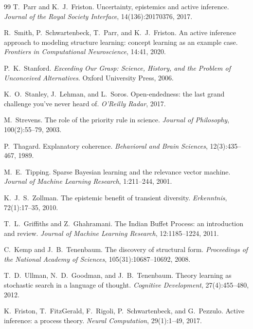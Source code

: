 \documentclass[runningheads]{llncs}
\begin{document}
\begin{thebibliography}{99}
T.~Parr and K.~J.~Friston.
Uncertainty, epistemics and active inference.
\emph{Journal of the Royal Society Interface}, 14(136):20170376, 2017.

R.~Smith, P.~Schwartenbeck, T.~Parr, and K.~J.~Friston.
An active inference approach to modeling structure learning: concept learning as an example case.
\emph{Frontiers in Computational Neuroscience}, 14:41, 2020.

P.~K.~Stanford.
\emph{Exceeding Our Grasp: Science, History, and the Problem of Unconceived Alternatives}.
Oxford University Press, 2006.

K.~O.~Stanley, J.~Lehman, and L.~Soros.
Open-endedness: the last grand challenge you've never heard of. \emph{O'Reilly Radar}, 2017.

M.~Strevens.
The role of the priority rule in science. \emph{Journal of Philosophy}, 100(2):55--79, 2003.

P.~Thagard.
Explanatory coherence. \emph{Behavioral and Brain Sciences}, 12(3):435--467, 1989.

M.~E.~Tipping.
Sparse Bayesian learning and the relevance vector machine.
\emph{Journal of Machine Learning Research}, 1:211--244, 2001.

K.~J.~S.~Zollman.
The epistemic benefit of transient diversity. \emph{Erkenntnis}, 72(1):17--35, 2010.

T.~L.~Griffiths and Z.~Ghahramani.
The Indian Buffet Process: an introduction and review.
\emph{Journal of Machine Learning Research}, 12:1185--1224, 2011.

C.~Kemp and J.~B.~Tenenbaum.
The discovery of structural form.
\emph{Proceedings of the National Academy of Sciences}, 105(31):10687--10692, 2008.

T.~D.~Ullman, N.~D.~Goodman, and J.~B.~Tenenbaum.
Theory learning as stochastic search in a language of thought.
\emph{Cognitive Development}, 27(4):455--480, 2012.

K.~Friston, T.~FitzGerald, F.~Rigoli, P.~Schwartenbeck, and G.~Pezzulo.
Active inference: a process theory. \emph{Neural Computation}, 29(1):1--49, 2017.


\end{thebibliography}
\end{document}
